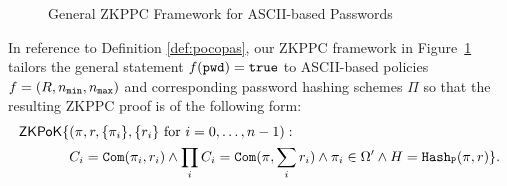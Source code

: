 \begin{figure}[t]
\caption{General ZKPPC Framework for ASCII-based Passwords}
\label{fig:zkpconeserver}
\end{figure}

\noindent
In reference to Definition \ref{def:pocopas}, our \ac{ZKPPC} framework in Figure~\ref{fig:zkpconeserver} tailors the general statement $f(\mathtt{pwd})=\mathtt{true}$ to \ac{ASCII}-based policies $f=(R,{n_\mathtt{min}},{n_\mathtt{max}})$ and corresponding password hashing schemes $\Pi$ so that the resulting \ac{ZKPPC} proof is of the following form:
\begin{align*}
\mathsf{ZKPoK}\{&(\pi,r,\{\pi_i\},\{r_i\}\textrm{ for }i=0,\ldots,n-1):\\
& C_i=\mathtt{Com}(\pi_i, r_i) \wedge \prod_iC_i=\mathtt{Com}(\pi, \sum_ir_i) \wedge \pi_i\in\Omega' \wedge H=\mathtt{Hash_P}(\pi,r)\}.
\end{align*}

